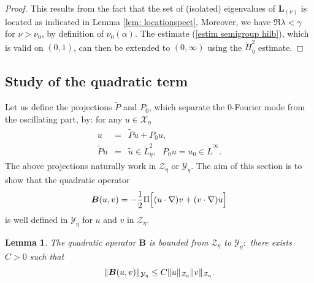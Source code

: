 \documentclass[11pt]{article}
\newtheorem{lemma}[theorem]{Lemma}
\begin{document}
\begin{proof}
This results from the fact that the set of (isolated) eigenvalues of $%
\boldsymbol{L}_{(\nu)}$ is located as indicated in Lemma \ref{lem: locationspect},
Moreover, we have $\Re \lambda <\gamma$ for $\nu>\nu_0$, by
definition of $\nu _{0}(\alpha )$.  The estimate  (\ref{estim semigroup hilb}), which is valid on $(0,1)$,
can then be extended to $(0,\infty)$ using the $\mathring{H}_{\eta}^{2}$ estimate.
\end{proof}



\subsection{Study of the quadratic term}




Let us define the projections $\widetilde{P}$ and $P_{0}$,
which separate the 0-Fourier mode from the oscillating part, by: for any $u\in 
\mathcal{X}_{\eta}$%
\begin{eqnarray*}
u &=&\widetilde{P}u+P_{0}u, \\
\widetilde{P}u &=&\widetilde{u}\in \mathring{L}_{\eta}^{2},\text{ }%
P_{0}u=u_{0}\in \mathring{L}^{\infty }.
\end{eqnarray*}%
The above projections naturally work  in $\mathcal{Z}_{\eta}$ or $\mathcal{Y}_{\eta}.$ 
The aim of this section is to show that the quadratic operator 
\begin{equation*}
\boldsymbol{B}(u,v)=-\frac{1}{2}\Pi  \Bigl[ (u\cdot \nabla )v+(v\cdot \nabla )u \Bigr]
\end{equation*}%
is well defined in $\mathcal{Y}_{\eta}$ for $u$ and $v$ in $\mathcal{Z}_{\eta}$.


\begin{lemma}
The quadratic operator $\boldsymbol{B}$ is bounded from $\mathcal{Z}_{\eta}$ to 
$\mathcal{Y}_{\eta}:$ there exists $C>0$ such that%
\begin{equation}
\|\boldsymbol{B}(u,v)\|_{\mathcal{Y}_{\eta}}\leq C\|u\|_{\mathcal{Z}_{\eta}}\|v\|_{%
\mathcal{Z}_{\eta}}.  \label{bound B}
\end{equation}
\end{lemma}
\end{document}
